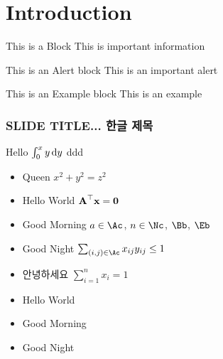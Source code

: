 



\frame[plain]{\titlepage}





\section[INTRO]{Introduction}

\begin{frame}

   \begin{block}{This is a Block}
      This is important information
   \end{block}

\pause

   \begin{alertblock}{This is an Alert block}
   This is an important alert
   \end{alertblock}

\pause

   \begin{exampleblock}{This is an Example block}
   This is an example 
   \end{exampleblock}

\end{frame}


\begin{frame}
\frametitle{SLIDE TITLE... 한글 제목}

Hello $\int_0^x y \mathop{}\!\mathrm{d}y$ \alert<2>{ddd}
\begin{itemize}
\item Queen $x^2 + y^2 = z^2$
\item Hello World $\boldsymbol{\mathbf{A}}^\top \boldsymbol{\mathbf{x}} = \boldsymbol{\mathbf{0}}$
\item Good Morning $a\in\Ac$, $n\in\Nc$, $\Bb$, $\Eb$
\item Good Night $\sum_{(i,j)\in\Ac} x_{ij} y_{ij} \leq 1$ 
\item 안녕하세요 $\textstyle\sum_{i=1}^n x_i = 1$
\end{itemize}

\begin{itemize}
\item<1-> Hello \alert{World}
\item<2-> Good \alert{Morning}
\item<3-> Good \alert{Night}
\end{itemize}

\end{frame}



